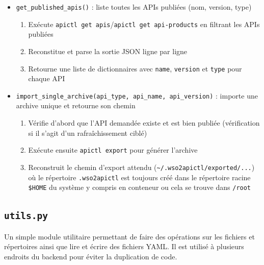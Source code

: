 \begin{itemize}
    \item[$\bullet$] \texttt{get\_published\_apis()} : liste toutes les APIs publiées (nom, version, type)
        \begin{enumerate}
            \item Exécute \texttt{apictl get apis}/\texttt{apictl get api-products} en filtrant les APIs publiées
            \item Reconstitue et parse la sortie JSON ligne par ligne
            \item Retourne une liste de dictionnaires avec \texttt{name}, \texttt{version} et \texttt{type} pour chaque API
        \end{enumerate}
    \item[$\bullet$] \texttt{import\_single\_archive(api\_type, api\_name, api\_version)} : importe une archive unique et retourne son chemin
        \begin{enumerate}
            \item Vérifie d'abord que l'API demandée existe et est bien publiée (vérification si il s'agit d'un rafraîchissement ciblé)
            \item Exécute ensuite \texttt{apictl export} pour générer l'archive
            \item Reconstruit le chemin d'export attendu (\texttt{\textasciitilde/.wso2apictl/exported/...}) où le répertoire \texttt{.wso2apictl} est toujours créé dans le répertoire racine \texttt{\$HOME} du système y compris en conteneur ou cela se trouve dans \texttt{/root}
        \end{enumerate}
\end{itemize}


\subsection{\texttt{utils.py}}
Un simple module utilitaire permettant de faire des opérations sur les fichiers et répertoires ainsi que lire et écrire des fichiers YAML. Il est utilisé à plusieurs endroits du backend pour éviter la duplication de code.

